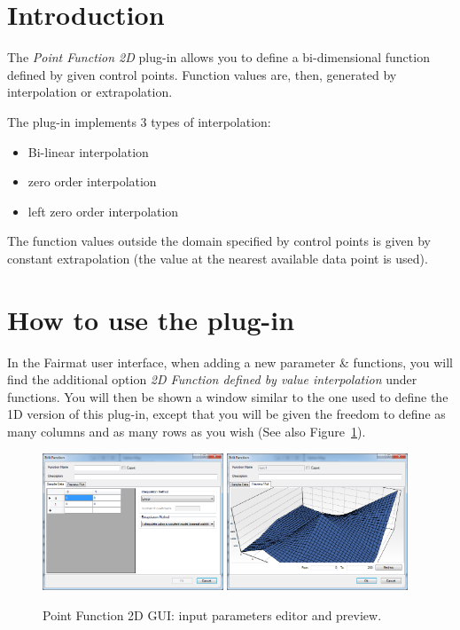 \newcommand{\pluginName}{Point Function 2D}
\newcommand{\pluginVersion}{1.0.0}



\section{Introduction}
The \emph{Point Function 2D} plug-in allows you to define a bi-dimensional function defined by given control points. Function values are, then, generated by interpolation or extrapolation.

The plug-in implements 3 types of interpolation:
\begin{itemize}
\item Bi-linear interpolation
\item zero order interpolation
\item left zero order interpolation
\end{itemize}

The function values outside the domain specified by control points is given by constant extrapolation (the value at the nearest available data point is used).

\section{How to use the plug-in}
In the Fairmat user interface, when adding a new parameter \& functions, you will find the additional option \emph{2D Function defined by value interpolation} under functions.
You will then be shown a window similar to the one used to define the 1D version of this plug-in, except that you will be given the freedom to define as many columns and as many rows as you wish (See also Figure~\ref{fig.PFunction2DGUI}).

\begin{figure}[ht]
\begin{center}
\includegraphics[width=0.48\textwidth]{./images/PFunction2DEdit.png}
\includegraphics[width=0.48\textwidth]{./images/PFunction2DPreview.png}
\caption{Point Function 2D GUI: input parameters editor and preview.}
\label{fig.PFunction2DGUI}
\end{center}
\end{figure}

